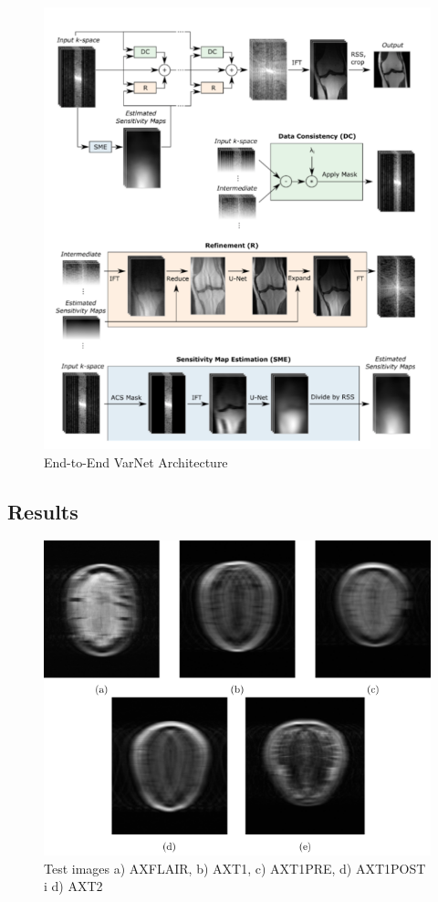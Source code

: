 \documentclass[10pt,a4paper]{article}
\begin{document}
\begin{figure}[H]
\centering
\includegraphics[scale=0.5]{images/e2e-varnet-architecture.png}
\caption{End-to-End VarNet Architecture}
\end{figure}

\subsection{Results}

\begin{figure}[H]
\centering
\includegraphics[width=400pt]{./images/test-images.png}
\caption{Test images a) AXFLAIR, b) AXT1, c) AXT1PRE, d) AXT1POST i d) AXT2}
\end{figure}
\end{document}
